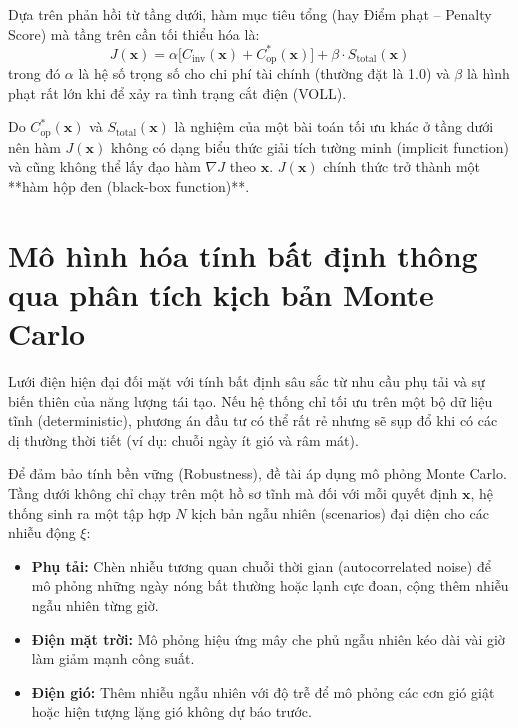 Dựa trên phản hồi từ tầng dưới, hàm mục tiêu tổng (hay Điểm phạt -- Penalty Score) mà tầng trên cần tối thiểu hóa là:
\begin{equation}
    J(\mathbf{x}) = \alpha \Big[ C_{\text{inv}}(\mathbf{x}) + C_{\text{op}}^*(\mathbf{x}) \Big] + \beta \cdot S_{\text{total}}(\mathbf{x})
    \label{eq:upper_objective}
\end{equation}
trong đó $\alpha$ là hệ số trọng số cho chi phí tài chính (thường đặt là 1.0) và $\beta$ là hình phạt rất lớn khi để xảy ra tình trạng cắt điện (VOLL).

Do $C_{\text{op}}^*(\mathbf{x})$ và $S_{\text{total}}(\mathbf{x})$ là nghiệm của một bài toán tối ưu khác ở tầng dưới nên hàm $J(\mathbf{x})$ không có dạng biểu thức giải tích tường minh (implicit function) và cũng không thể lấy đạo hàm $\nabla J$ theo $\mathbf{x}$. $J(\mathbf{x})$ chính thức trở thành một **hàm hộp đen (black-box function)**.

\section{Mô hình hóa tính bất định thông qua phân tích kịch bản Monte Carlo}

Lưới điện hiện đại đối mặt với tính bất định sâu sắc từ nhu cầu phụ tải và sự biến thiên của năng lượng tái tạo. Nếu hệ thống chỉ tối ưu trên một bộ dữ liệu tĩnh (deterministic), phương án đầu tư có thể rất rẻ nhưng sẽ sụp đổ khi có các dị thường thời tiết (ví dụ: chuỗi ngày ít gió và râm mát).

Để đảm bảo tính bền vững (Robustness), đề tài áp dụng mô phỏng Monte Carlo. Tầng dưới không chỉ chạy trên một hồ sơ tĩnh mà đối với mỗi quyết định $\mathbf{x}$, hệ thống sinh ra một tập hợp $N$ kịch bản ngẫu nhiên (scenarios) đại diện cho các nhiễu động $\xi$:
\begin{itemize}
    \item \textbf{Phụ tải:} Chèn nhiễu tương quan chuỗi thời gian (autocorrelated noise) để mô phỏng những ngày nóng bất thường hoặc lạnh cực đoan, cộng thêm nhiễu ngẫu nhiên từng giờ.
    \item \textbf{Điện mặt trời:} Mô phỏng hiệu ứng mây che phủ ngẫu nhiên kéo dài vài giờ làm giảm mạnh công suất.
    \item \textbf{Điện gió:} Thêm nhiễu ngẫu nhiên với độ trễ để mô phỏng các cơn gió giật hoặc hiện tượng lặng gió không dự báo trước.
\end{itemize}

